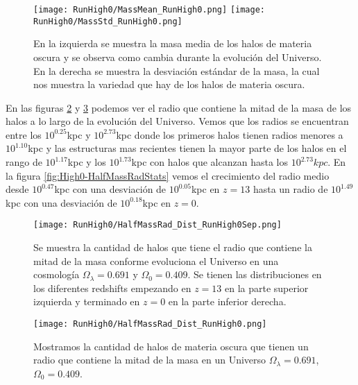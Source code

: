 \begin{figure}[H]
    \centering
    \texttt{[image: RunHigh0/MassMean\_RunHigh0.png]}
    \texttt{[image: RunHigh0/MassStd\_RunHigh0.png]}
    \caption[Media y desviación estándar de la distribución de masa]{\footnotesize En la izquierda se muestra la masa media de los halos de materia oscura y se observa como cambia durante la evolución del Universo. En la derecha se muestra la desviación estándar de la masa, la cual nos muestra la variedad que hay de los halos de materia oscura.}
    \label{fig:High0-MassStats}
\end{figure}

En las figuras \ref{fig:High0-HalfMassRadDistSep} y \ref{fig:High0-HalfMassRadDist} podemos ver el radio que contiene la mitad de la masa de los halos a lo largo de la evolución del Universo. Vemos que los radios se encuentran entre los $10^{0.25}$kpc y $10^{2.73}$kpc donde los primeros halos tienen radios menores a $10^{1.10}$kpc y las estructuras mas recientes tienen la mayor parte de los halos en el rango de $10^{1.17}$kpc y los $10^{1.73}$kpc con halos que alcanzan hasta los $10^{2.73}kpc$. En la figura \ref{fig:High0-HalfMassRadStats} vemos el crecimiento del radio medio desde $10^{0.47}$kpc con una desviación de $10^{0.05}$kpc en $z=13$ hasta un radio de $10^{1.49}$kpc con una desviación de $10^{0.18}$kpc en $z=0$.

\begin{figure}[H]
    \centering
    \texttt{[image: RunHigh0/HalfMassRad\_Dist\_RunHigh0Sep.png]}
    \caption[Radio que contiene la mitad de la masa]{\footnotesize Se muestra la cantidad de halos que tiene el radio que contiene la mitad de la masa conforme evoluciona el Universo en una cosmología $\Omega_\lambda = 0.691$ y $\Omega_0 = 0.409$. Se tienen las distribuciones en los diferentes redshifts empezando en $z=13$ en la parte superior izquierda y terminado en $z=0$ en la parte inferior derecha.}
    \label{fig:High0-HalfMassRadDistSep}
\end{figure}

\begin{figure}[H]
    \centering
    \texttt{[image: RunHigh0/HalfMassRad\_Dist\_RunHigh0.png]}
    \caption[Distribución del radio que contiene la mitad de la masa]{\footnotesize Mostramos la cantidad de halos de materia oscura que tienen un radio que contiene la mitad de la masa en un Universo $\Omega_\lambda = 0.691$, $\Omega_0 = 0.409$.}
    \label{fig:High0-HalfMassRadDist}
\end{figure}


